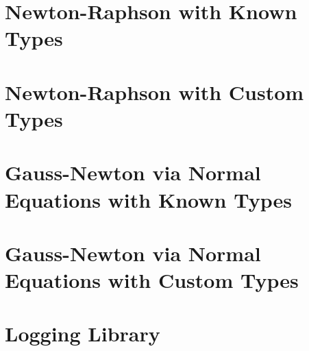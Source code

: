 \let\mypdfximage\pdfximage\def\pdfximage{\immediate\mypdfximage}\documentclass[twoside]{book}
\newcommand{\+}{\discretionary{\mbox{\scriptsize$\hookleftarrow$}}{}{}}
\newcommand{\clearemptydoublepage}{%
  \newpage{\pagestyle{empty}\cleardoublepage}%
}
\begin{document}
\chapter{Newton-\/\+Raphson with Known Types}
\label{md_pages_solvers_nonlinear_tutorial_1}

\chapter{Newton-\/\+Raphson with Custom Types}
\label{md_pages_solvers_nonlinear_tutorial_2}

\chapter{Gauss-\/\+Newton via Normal Equations with Known Types}
\label{md_pages_solvers_nonlinear_tutorial_3}

\chapter{Gauss-\/\+Newton via Normal Equations with Custom Types}
\label{md_pages_solvers_nonlinear_tutorial_4}

\chapter{Logging Library}
\label{md_pages_utils_logger}


\backmatter
\newpage
{}
\clearemptydoublepage
{}
\printindex
\end{document}
